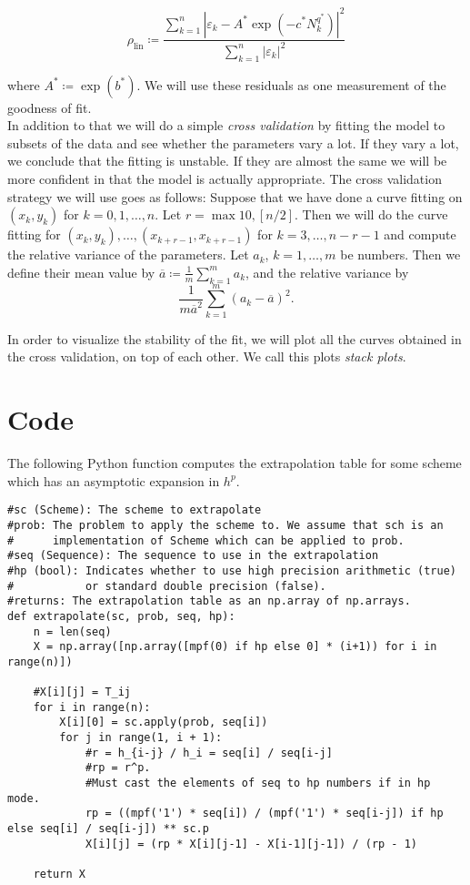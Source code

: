 \[
\rho_{\operatorname{lin}}\coloneqq \frac{\sum_{k=1}^n|\varepsilon_k - A^*\exp(-c^*N_k^{q^*})|^2}{\sum_{k=1}^n|\varepsilon_k|^2}
\]

where \(A^*\coloneqq \exp(b^*)\). We will use these residuals as one measurement of the goodness of fit.\\

In addition to that we will do a simple {\it cross validation} by fitting the model to subsets of the data and see whether the parameters vary a lot. If they vary a lot, we conclude that the fitting is unstable. If they are almost the same we will be more confident in that the model is actually appropriate. The cross validation strategy we will use goes as follows: Suppose that we have done a curve fitting on \((x_k,y_k)\) for \(k=0,1,\ldots,n\). Let \(r = \max{10, [n/2]}\). Then we will do the curve fitting for \((x_k,y_k), \ldots, (x_{k+r-1},x_{k+r-1})\) for \(k=3,\ldots,n-r-1\) and compute the relative variance of the parameters. Let \(a_k\), \(k=1,\ldots, m\) be numbers. Then we define their mean value by \(\overline{a} \coloneqq \frac{1}{m}\sum_{k=1}^m a_k\), and the relative variance by 
\[
\frac{1}{m\overline{a}^2}\sum_{k=1}^m (a_k - \overline{a})^2. 
\]

In order to visualize the stability of the fit, we will plot all the curves obtained in the cross validation, on top of each other. We call this plots {\it stack plots}. 
\section{Code}

The following Python function computes the extrapolation table for some scheme which has an asymptotic expansion in \(h^p\).

\begin{verbatim}
#sc (Scheme): The scheme to extrapolate	
#prob: The problem to apply the scheme to. We assume that sch is an 
#      implementation of Scheme which can be applied to prob.
#seq (Sequence): The sequence to use in the extrapolation
#hp (bool): Indicates whether to use high precision arithmetic (true) 
#           or standard double precision (false).
#returns: The extrapolation table as an np.array of np.arrays.
def extrapolate(sc, prob, seq, hp):
	n = len(seq)
	X = np.array([np.array([mpf(0) if hp else 0] * (i+1)) for i in range(n)])

	#X[i][j] = T_ij
	for i in range(n):
		X[i][0] = sc.apply(prob, seq[i])
		for j in range(1, i + 1):
			#r = h_{i-j} / h_i = seq[i] / seq[i-j]
			#rp = r^p.
			#Must cast the elements of seq to hp numbers if in hp mode.
			rp = ((mpf('1') * seq[i]) / (mpf('1') * seq[i-j]) if hp else seq[i] / seq[i-j]) ** sc.p
			X[i][j] = (rp * X[i][j-1] - X[i-1][j-1]) / (rp - 1)

	return X
\end{verbatim}
